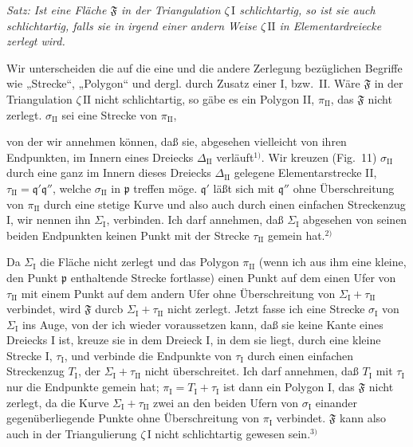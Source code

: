 \documentclass{article}
\begin{document}
\emph{Satz: Ist eine Fläche $\mathfrak{F}$ in der Triangulation $\zeta\,\mathrm{I}$ schlichtartig, so ist sie auch schlichtartig, falls sie in irgend einer andern Weise $\zeta\,\mathrm{II}$ in Elementardreiecke zerlegt wird.}

Wir unterscheiden die auf die eine und die andere Zerlegung bezüglichen Begriffe wie „Strecke“, „Polygon“ und dergl. durch Zusatz einer I, bzw.\ II. Wäre $\mathfrak{F}$ in der Triangulation $\zeta\,\mathrm{II}$ nicht schlichtartig, so gäbe es ein Polygon II, $\pi_{\mathrm{II}}$, das $\mathfrak{F}$ nicht zerlegt. $\sigma_{\mathrm{II}}$ sei eine Strecke von $\pi_{\mathrm{II}}$,

von der wir annehmen können, daß sie, abgesehen vielleicht von ihren Endpunkten, im Innern eines Dreiecks $\Delta_{\mathrm{II}}$ verläuft${}^{1)}$. Wir kreuzen (Fig.~11) $\sigma_{\mathrm{II}}$ durch eine ganz im Innern dieses Dreiecks $\Delta_{\mathrm{II}}$ gelegene Elementarstrecke II, $\tau_{\mathrm{II}} = \mathfrak{q}'\mathfrak{q}''$, welche $\sigma_{\mathrm{II}}$ in $\mathfrak{p}$ treffen möge. $\mathfrak{q}'$ läßt sich mit $\mathfrak{q}''$ ohne Überschreitung von $\pi_{\mathrm{II}}$ durch eine stetige Kurve und also auch durch einen einfachen Streckenzug I, wir nennen ihn $\varSigma_{\mathrm{I}}$, verbinden. Ich darf annehmen, daß $\varSigma_{\mathrm{I}}$ abgesehen von seinen beiden Endpunkten keinen Punkt mit der Strecke $\tau_{\mathrm{II}}$ gemein hat.${}^{2)}$


Da $\varSigma_{\mathrm{I}}$ die Fläche nicht zerlegt und das Polygon $\pi_{\mathrm{II}}$ (wenn ich aus ihm eine kleine, den Punkt $\mathfrak{p}$ enthaltende Strecke fortlasse) einen Punkt auf dem einen Ufer von $\tau_{\mathrm{II}}$ mit einem Punkt auf dem andern Ufer ohne Überschreitung von $\varSigma_{\mathrm{I}} + \tau_{\mathrm{II}}$ verbindet, wird $\mathfrak{F}$ durcb $\varSigma_{\mathrm{I}} + \tau_{\mathrm{II}}$ nicht zerlegt. Jetzt fasse ich eine Strecke $\sigma_{\mathrm{I}}$ von $\varSigma_{\mathrm{I}}$ ins Auge, von der ich wieder voraussetzen kann, daß sie keine Kante eines Dreiecks I ist, kreuze sie in dem Dreieck I, in dem sie liegt, durch eine kleine Strecke I, $\tau_{\mathrm{I}}$, und verbinde die Endpunkte von $\tau_{\mathrm{I}}$ durch einen einfachen Streckenzug $T_{\mathrm{I}}$, der $\varSigma_{\mathrm{I}} + \tau_{\mathrm{II}}$ nicht überschreitet. Ich darf annehmen, daß $T_{\mathrm{I}}$ mit $\tau_{\mathrm{I}}$ nur die Endpunkte gemein hat; $\pi_{\mathrm{I}} = T_{\mathrm{I}} + \tau_{\mathrm{I}}$ ist dann ein Polygon I, das $\mathfrak{F}$ nicht zerlegt, da die Kurve $\varSigma_{\mathrm{I}} + \tau_{\mathrm{II}}$ zwei an den beiden Ufern von $\sigma_{\mathrm{I}}$ einander gegenüberliegende Punkte ohne Überschreitung von $\pi_{\mathrm{I}}$ verbindet. $\mathfrak{F}$ kann also auch in der Triangulierung $\zeta\,\mathrm{I}$ nicht schlichtartig gewesen sein.${}^{3)}$
\end{document}
